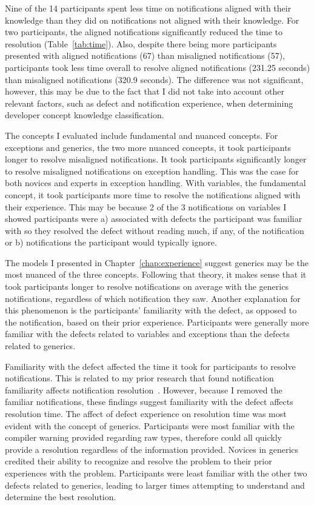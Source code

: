 Nine of the 14 participants spent less time on notifications aligned with their knowledge than they did on notifications not aligned with their knowledge.
For two participants, the aligned notifications significantly reduced the time to resolution (Table~\ref{tab:time}).
Also, despite there being more participants presented with aligned notifications (67) than misaligned notifications (57), participants took less time overall to resolve aligned notifications (231.25 seconds) than misaligned notifications (320.9 seconds). The difference was not significant, however, this may be due to the fact that I did not take into account other relevant factors, such as defect and notification experience, when determining developer concept knowledge classification.

The concepts I evaluated include fundamental and nuanced concepts.
For exceptions and generics, the two more nuanced concepts, it took participants longer to resolve misaligned notifications.
It took participants significantly longer to resolve misaligned notifications on exception handling. 
This was the case for both novices and experts in exception handling.
With variables, the fundamental concept, it took participants more time to resolve the notifications aligned with their experience. 
This may be because 2 of the 3 notifications on variables I showed participants were a) associated with defects the participant was familiar with so they resolved the defect without reading much, if any, of the notification or b) notifications the participant would typically ignore.

The models I presented in Chapter~\ref{chap:experience} suggest generics may be the most nuanced of the three concepts. Following that theory, it makes sense that it took participants longer to resolve notifications on average with the generics notifications, regardless of which notification they saw.
Another explanation for this phenomenon is the participants' familiarity with the defect, as opposed to the notification, based on their prior experience.
Participants were generally more familiar with the defects related to variables and exceptions than the defects related to generics.

Familiarity with the defect affected the time it took for participants to resolve notifications.
This is related to my prior research that found notification familiarity affects notification resolution~\cite{johnson2016cross}. However, because I removed the familiar notifications, these findings suggest familiarity with the defect affects resolution time.
The affect of defect experience on resolution time was most evident with the concept of generics. Participants were most familiar with the compiler warning provided regarding raw types, therefore could all quickly provide a resolution regardless of the information provided.
Novices in generics credited their ability to recognize and resolve the problem to their prior experiences with the problem.
Participants were least familiar with the other two defects related to generics, leading to larger times attempting to understand and determine the best resolution. 



